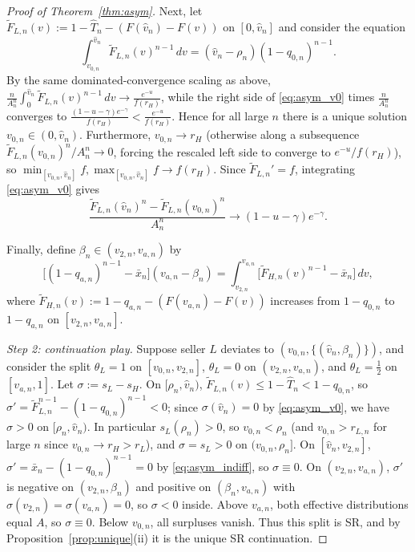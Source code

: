 \documentclass[12pt]{article}
\theoremstyle{mystyle}
\theoremstyle{mystyle2}
\newcommand{\1}{\mathbf{1}}
\begin{document}
\begin{proof}[Proof of Theorem~\ref{thm:asym}]
Next, let $\tilde F_{L,n}(v):=1-\hat T_n-(F(\hat v_n)-F(v))$ on $[0,\hat v_n]$ and consider the equation
\begin{equation}\label{eq:asym_v0}
\int_{v_{0,n}}^{\hat v_n} \tilde F_{L,n}(v)^{n-1}\,dv = (\hat v_n-\rho_n)(1-q_{0,n})^{n-1}.
\end{equation}
By the same dominated-convergence scaling as above, $\frac{n}{A_n^n}\int_0^{\hat v_n} \tilde F_{L,n}(v)^{n-1}\,dv\to\frac{e^{-u}}{f(r_H)}$, while the right side of \eqref{eq:asym_v0} times $\frac{n}{A_n^n}$ converges to $\frac{(1-u-\gamma)e^{-\gamma}}{f(r_H)}<\frac{e^{-u}}{f(r_H)}$. Hence for all large $n$ there is a unique solution $v_{0,n}\in(0,\hat v_n)$. Furthermore, $v_{0,n}\to r_H$ (otherwise along a subsequence $\tilde F_{L,n}(v_{0,n})^n/A_n^n\to 0$, forcing the rescaled left side to converge to $e^{-u}/f(r_H)$), so $\min_{[v_{0,n},\hat v_n]}f,\max_{[v_{0,n},\hat v_n]}f\to f(r_H)$. Since $\tilde F_{L,n}'=f$, integrating \eqref{eq:asym_v0} gives
\begin{equation}\label{eq:asym_block_diff}
\frac{\tilde F_{L,n}(\hat v_n)^n - \tilde F_{L,n}(v_{0,n})^n}{A_n^n} \longrightarrow (1-u-\gamma)e^{-\gamma}.
\end{equation}

Finally, define $\beta_n\in(v_{2,n},v_{a,n})$ by
\[
\bigl[(1-q_{a,n})^{n-1}-\bar x_n\bigr](v_{a,n}-\beta_n) = \int_{v_{2,n}}^{v_{a,n}}\bigl[\tilde F_{H,n}(v)^{n-1}-\bar x_n\bigr]\,dv,
\]
where $\tilde F_{H,n}(v):=1-q_{a,n}-(F(v_{a,n})-F(v))$ increases from $1-q_{0,n}$ to $1-q_{a,n}$ on $[v_{2,n},v_{a,n}]$.

\emph{Step 2: continuation play.} Suppose seller $L$ deviates to $(v_{0,n},\{(\hat v_n,\beta_n)\})$, and consider the split $\theta_L=1$ on $[v_{0,n},v_{2,n}]$, $\theta_L=0$ on $(v_{2,n},v_{a,n})$, and $\theta_L=\frac{1}{2}$ on $[v_{a,n},1]$. Let $\sigma:=s_L-s_H$. On $[\rho_n,\hat v_n)$, $\tilde F_{L,n}(v)\le 1-\hat T_n<1-q_{0,n}$, so $\sigma'=\tilde F_{L,n}^{n-1}-(1-q_{0,n})^{n-1}<0$; since $\sigma(\hat v_n)=0$ by \eqref{eq:asym_v0}, we have $\sigma>0$ on $[\rho_n,\hat v_n)$. In particular $s_L(\rho_n)>0$, so $v_{0,n}<\rho_n$ (and $v_{0,n}>r_{L,n}$ for large $n$ since $v_{0,n}\to r_H>r_L$), and $\sigma=s_L>0$ on $(v_{0,n},\rho_n]$. On $[\hat v_n,v_{2,n}]$, $\sigma'=\bar x_n-(1-q_{0,n})^{n-1}=0$ by \eqref{eq:asym_indiff}, so $\sigma\equiv 0$. On $(v_{2,n},v_{a,n})$, $\sigma'$ is negative on $(v_{2,n},\beta_n)$ and positive on $(\beta_n,v_{a,n})$ with $\sigma(v_{2,n})=\sigma(v_{a,n})=0$, so $\sigma<0$ inside. Above $v_{a,n}$, both effective distributions equal $A$, so $\sigma\equiv 0$. Below $v_{0,n}$, all surpluses vanish. Thus this split is SR, and by Proposition~\ref{prop:unique}(ii) it is the unique SR continuation.


\end{proof}
\end{document}
